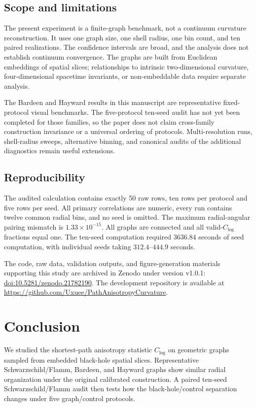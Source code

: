 \documentclass[11pt]{article}
\newcommand{\clog}{C_{\log}}
\begin{document}
\subsection{Scope and limitations}

The present experiment is a finite-graph benchmark, not a continuum curvature
reconstruction. It uses one graph size, one shell radius, one bin count, and ten
paired realizations. The confidence intervals are broad, and the analysis does
not establish continuum convergence. The graphs are built from Euclidean
embeddings of spatial slices; relationships to intrinsic two-dimensional
curvature, four-dimensional spacetime invariants, or non-embeddable data require
separate analysis.

The Bardeen and Hayward results in this manuscript are representative
fixed-protocol visual benchmarks. The five-protocol ten-seed audit has not yet
been completed for those families, so the paper does not claim cross-family
construction invariance or a universal ordering of protocols. Multi-resolution
runs, shell-radius sweeps, alternative binning, and canonical audits of the
additional diagnostics remain useful extensions.

\subsection{Reproducibility}

The audited calculation contains exactly 50 raw rows, ten rows per protocol and
five rows per seed. All primary correlations are numeric, every run contains
twelve common radial bins, and no seed is omitted. The maximum radial-angular
pairing mismatch is $1.33\times10^{-15}$. All graphs are connected and all
valid-$\clog$ fractions equal one. The ten-seed computation required
$3636.84$ seconds of seed computation, with individual seeds taking
$312.4$--$444.9$ seconds.

The code, raw data, validation outputs, and figure-generation materials
supporting this study are archived in Zenodo under version v1.0.1:
\href{https://doi.org/10.5281/zenodo.21782190}{doi:10.5281/zenodo.21782190}.
The development repository is available at
\url{https://github.com/Uxuee/PathAnisotropyCurvature}.

\section{Conclusion}

We studied the shortest-path anisotropy statistic $\clog$ on geometric graphs
sampled from embedded black-hole spatial slices. Representative
Schwarzschild/Flamm, Bardeen, and Hayward graphs show similar radial organization
under the original calibrated construction. A paired ten-seed
Schwarzschild/Flamm audit then tests how the black-hole/control separation
changes under five graph/control protocols.
\end{document}
